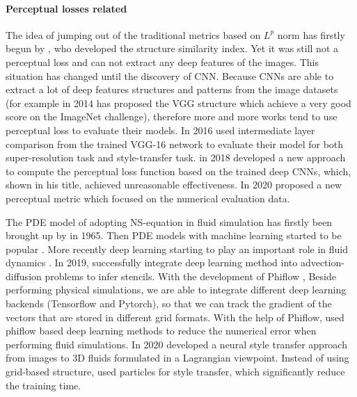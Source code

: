 \documentclass[a4paper,12pt,twoside]{report}
\begin{document}
\paragraph{Perceptual losses related}The idea of jumping out of the traditional metrics based on $L^p$ norm has firstly begun by \cite{wang2004}, who developed the structure similarity index. Yet it was still not a perceptual loss and can not extract any deep features of the images. This situation has changed  until the discovery of CNN. Because CNNs are able to extract a lot of deep features structures and patterns from the image datasets (for example in 2014 \cite{simonyan2014very} has proposed the VGG structure which achieve a very good score on the ImageNet challenge), therefore more and more  works tend to use perceptual loss to evaluate their models\cite{amirshahi2016, berardino2017, bosse2016, kang2014, kim2017}. In 2016 \cite{johnson2016perceptual} used intermediate layer comparison from the trained VGG-16 network to evaluate their model for both super-resolution task and style-transfer task.  in 2018 \cite{zhang2018perceptual} developed a new approach to compute the perceptual loss function based on the trained deep CNNs, which, shown in his title, achieved unreasonable effectiveness. In 2020 \cite{kohl2020learning} proposed a new perceptual metric which focused on the numerical evaluation data.

The PDE model of adopting NS-equation in fluid simulation has firstly been brought up by \cite{doi:10.1063/1.1761178} in 1965. Then PDE models with machine learning started to be popular \cite{crutchfield1987equations,kevrekidis2003equation,brunton2016discovering}. More recently deep learning starting to play an important role in fluid dynamics \cite{kutz2017}. In 2019, \citeauthor{barsinai2019data} successfully integrate deep learning method into advection-diffusion problems to infer stencils. With the development of Phiflow \cite{holl2020learning}, Beside performing physical simulations, we are able to integrate different deep learning backends (Tensorflow and Pytorch), so that we can track the gradient of the vectors that are stored in different grid formats. With the help of Phiflow, \cite{um2020sol} used phiflow based deep learning methods to reduce the numerical error when performing fluid simulations. In 2020 \citeauthor{kim2020lagrangian} developed a neural style transfer approach from images to 3D fluids formulated in a Lagrangian viewpoint. Instead of using grid-based structure, \citeauthor{kim2020lagrangian} used particles for style transfer, which significantly reduce the training time.
\end{document}
